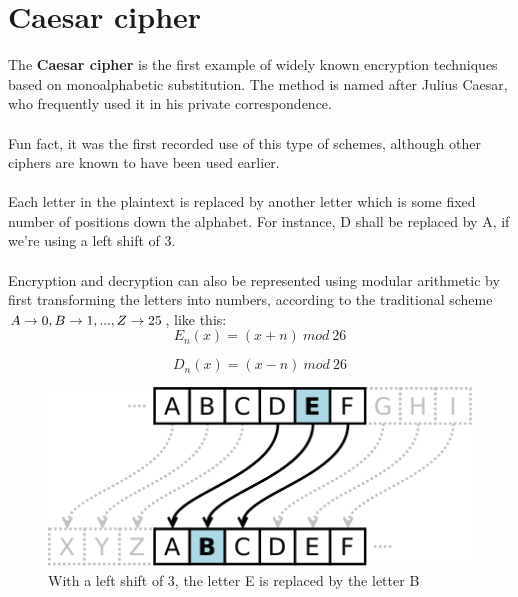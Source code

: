\documentclass[Lau,binding=0.6cm,oneside]{sapthesis}
\begin{document}
\section{Caesar cipher}
The \textbf{Caesar cipher} is the first example of widely known encryption techniques based on monoalphabetic substitution. The method is named after Julius Caesar, who frequently used it in his private correspondence. \\\\
Fun fact, it was the first recorded use of this type of schemes, although other ciphers are known to have been used earlier.\\\\
Each letter in the plaintext is replaced by another letter which is some fixed number of positions down the alphabet. For instance, \textsf{D} shall be replaced by \textsf{A}, if we're using a left shift of 3.\\\\
Encryption and decryption can also be represented using modular arithmetic by first transforming the letters into numbers, according to the traditional scheme $A \rightarrow 0,\\ B \rightarrow 1, ... , Z \rightarrow 25$, like this:\\

\begin{equation}
E_{n}({x}) = (x + n) \ mod \ 26
\end{equation}

\begin{equation}
D_{n}({x}) = (x - n) \ mod \ 26
\end{equation}

\newpage

\begin{figure}[H]
\includegraphics[scale=0.34]{caesar_cipher}
\centering
\caption{With a left shift of 3, the letter \textsf{E} is replaced by the letter \textsf{B}}
\centering
\end{figure}
\end{document}
